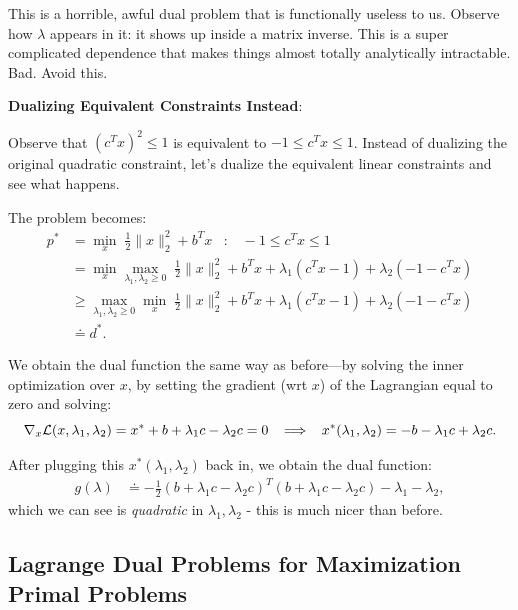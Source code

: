 \documentclass[12pt]{article}
\begin{document}
\begin{example}
This is a horrible, awful dual problem that is functionally useless to us. Observe how $\lambda$ appears in it: it shows up inside a matrix inverse. This is a super complicated dependence that makes things almost totally analytically intractable. Bad. Avoid this.


\textbf{Dualizing Equivalent Constraints Instead}:

Observe that $(c^T x)^2 \leq 1$ is equivalent to $-1 \leq c^T x \leq 1$. Instead of dualizing the original quadratic constraint, let's dualize the equivalent linear constraints and see what happens.

The problem becomes:
%
\begin{align*}
p^* &= \min_x \;\frac{1}{2} \|x\|_2^2 + b^T x \;\;\; : \;\;\;  -1 \leq c^T x \leq 1 \\
&= \min_x \max_{\lambda_1, \lambda_2 \geq 0} \; \frac{1}{2} \|x\|_2^2 + b^T x + \lambda_1 \left(c^T x - 1 \right) + \lambda_2 \left(-1 - c^T x \right) \\
&\geq \max_{\lambda_1, \lambda_2 \geq 0} \min_x \; \frac{1}{2} \|x\|_2^2 + b^T x + \lambda_1 \left(c^T x - 1 \right) + \lambda_2 \left(-1 - c^T x \right) \\
&\doteq d^*.
\end{align*}

We obtain the dual function the same way as before---by solving the inner optimization over $x$, by setting the gradient (wrt $x$) of the Lagrangian equal to zero and solving:
%
\begin{equation*}
\nabla_x {\mathcal L}(x,\lambda_1, \lambda_2) = x^* + b + \lambda_1 c - \lambda_2 c = 0 \;\;\; \Longrightarrow \;\;\; x^* (\lambda_1, \lambda_2) = -b - \lambda_1 c + \lambda_2 c.
\end{equation*}

After plugging this $x^*(\lambda_1, \lambda_2)$ back in, we obtain the dual function:
%
\begin{align*}
g(\lambda) &\doteq -\frac{1}{2} \left(b +\lambda_1 c - \lambda_2 c\right)^T (b + \lambda_1 c - \lambda_2 c) - \lambda_1 - \lambda_2,
\end{align*}
%
which we can see is \textit{quadratic} in $\lambda_1, \lambda_2$ - this is much nicer than before. 

\end{example}

\subsection{Lagrange Dual Problems for Maximization Primal Problems}
\end{document}

